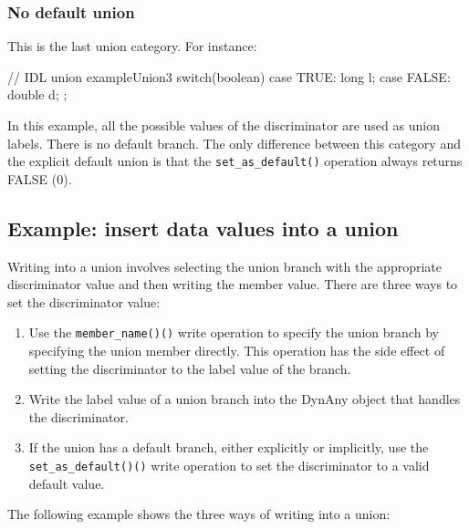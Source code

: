 \documentclass[11pt,twoside,a4paper]{book}
\newcommand{\op}[1]{\texttt{#1()}}
\newcommand{\dsc}{\discretionary{}{}{}}
\begin{document}
\subsubsection{No default union}

This is the last union category. For instance:

\begin{idllisting}
// IDL
union exampleUnion3 switch(boolean) {
case TRUE: long l;
case FALSE: double d; 
};
\end{idllisting}

In this example, all the possible values of the discriminator are used
as union labels. There is no default branch. The only difference
between this category and the explicit default union is that the
\op{set\_as\_default} operation always returns FALSE (0).


\subsection{Example: insert data values into a union}

Writing into a union involves selecting the union branch with the
appropriate discriminator value and then writing the member value.
There are three ways to set the discriminator value:

\begin{enumerate}

\item Use the \op{member\_name()} write operation to specify the union
branch by specifying the union member directly. This operation has the
side effect of setting the discriminator to the label value of the
branch.

\item Write the label value of a union branch into the DynAny object
that handles the discriminator.

\item If the union has a default branch, either explicitly or
implicitly, use the \op{set\_\dsc{}as\_default()} write operation to
set the discriminator to a valid default value.

\end{enumerate}

The following example shows the three ways of writing into a union:
\end{document}
